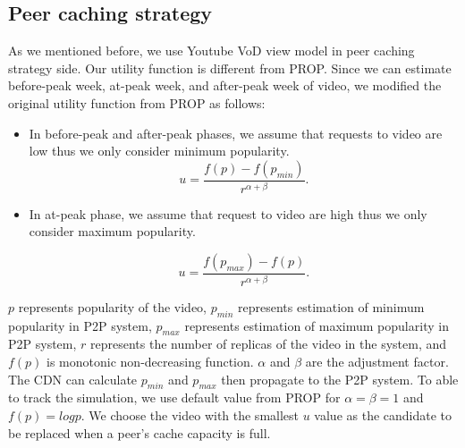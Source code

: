 \documentclass[10pt,final,journal,a4paper]{IEEEtran}
\begin{document}
\subsection{Peer caching strategy}\label{peercachingstrategy}
As we mentioned before, we use Youtube VoD view model in peer caching strategy side. 
Our utility function is different from PROP.
Since we can estimate before-peak week, at-peak week, and after-peak week of video, we modified the original utility function from PROP as follows: 
\begin{itemize}

\item In before-peak and after-peak phases, we assume that requests to video are low thus we only consider minimum popularity.
\begin{equation}
u = \frac{f(p)-f(p_{min})} {r^{\alpha+\beta}}.
\label{eq:utilityfunctionbeforeafter}
\end{equation}

\item In at-peak phase, we assume that request to video are high thus we only consider maximum popularity.  

\begin{equation}
u = \frac{f(p_{max})-f(p)}{r^{\alpha+\beta}}.
\label{eq:utilityfunctionat}
\end{equation}
\end{itemize}

$p$ represents popularity of the video, $p_{min}$ represents estimation of minimum popularity in P2P system, $p_{max}$ represents estimation of maximum popularity in P2P system, $r$ represents the number of replicas of the video in the system, and $f(p)$ is monotonic non-decreasing function.
$\alpha$ and $\beta$ are the adjustment factor.
The CDN can calculate $p_{min}$ and $p_{max}$ then propagate to the P2P system.
To able to track the simulation, we use default value from PROP for $\alpha=\beta=1$ and $f(p)=log p$.
We choose the video with the smallest $u$ value as the candidate to be replaced when a peer's cache capacity is full.
\end{document}

